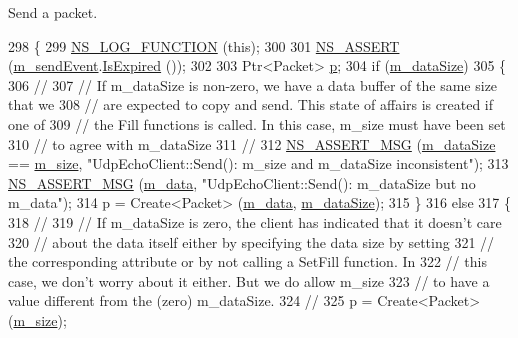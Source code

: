 Send a packet. 


\begin{DoxyCode}
298 \{
299   \hyperlink{log-macros-disabled_8h_a90b90d5bad1f39cb1b64923ea94c0761}{NS\_LOG\_FUNCTION} (\textcolor{keyword}{this});
300 
301   \hyperlink{assert_8h_a6dccdb0de9b252f60088ce281c49d052}{NS\_ASSERT} (\hyperlink{classns3_1_1UdpEchoClient_a593a5c30ddbb9b8ad69d86c7b466f9db}{m\_sendEvent}.\hyperlink{classns3_1_1EventId_a5c30c92e7c1c34b4e8505cc07ed71b02}{IsExpired} ());
302 
303   Ptr<Packet> \hyperlink{lte__link__budget_8m_ac9de518908a968428863f829398a4e62}{p};
304   \textcolor{keywordflow}{if} (\hyperlink{classns3_1_1UdpEchoClient_aea0cf40ebfcf21668f3c341d78877f57}{m\_dataSize})
305     \{
306       \textcolor{comment}{//}
307       \textcolor{comment}{// If m\_dataSize is non-zero, we have a data buffer of the same size that we}
308       \textcolor{comment}{// are expected to copy and send.  This state of affairs is created if one of}
309       \textcolor{comment}{// the Fill functions is called.  In this case, m\_size must have been set}
310       \textcolor{comment}{// to agree with m\_dataSize}
311       \textcolor{comment}{//}
312       \hyperlink{assert_8h_aff5ece9066c74e681e74999856f08539}{NS\_ASSERT\_MSG} (\hyperlink{classns3_1_1UdpEchoClient_aea0cf40ebfcf21668f3c341d78877f57}{m\_dataSize} == \hyperlink{classns3_1_1UdpEchoClient_a5d4e4cd4fc2479c9b87207c9bbc4b7c8}{m\_size}, \textcolor{stringliteral}{"UdpEchoClient::Send(): m\_size and
       m\_dataSize inconsistent"});
313       \hyperlink{assert_8h_aff5ece9066c74e681e74999856f08539}{NS\_ASSERT\_MSG} (\hyperlink{classns3_1_1UdpEchoClient_a960048a7dc6bd0bae92a4ff7aa4d148b}{m\_data}, \textcolor{stringliteral}{"UdpEchoClient::Send(): m\_dataSize but no m\_data"});
314       p = Create<Packet> (\hyperlink{classns3_1_1UdpEchoClient_a960048a7dc6bd0bae92a4ff7aa4d148b}{m\_data}, \hyperlink{classns3_1_1UdpEchoClient_aea0cf40ebfcf21668f3c341d78877f57}{m\_dataSize});
315     \}
316   \textcolor{keywordflow}{else}
317     \{
318       \textcolor{comment}{//}
319       \textcolor{comment}{// If m\_dataSize is zero, the client has indicated that it doesn't care}
320       \textcolor{comment}{// about the data itself either by specifying the data size by setting}
321       \textcolor{comment}{// the corresponding attribute or by not calling a SetFill function.  In}
322       \textcolor{comment}{// this case, we don't worry about it either.  But we do allow m\_size}
323       \textcolor{comment}{// to have a value different from the (zero) m\_dataSize.}
324       \textcolor{comment}{//}
325       p = Create<Packet> (\hyperlink{classns3_1_1UdpEchoClient_a5d4e4cd4fc2479c9b87207c9bbc4b7c8}{m\_size});

\end{DoxyCode}
